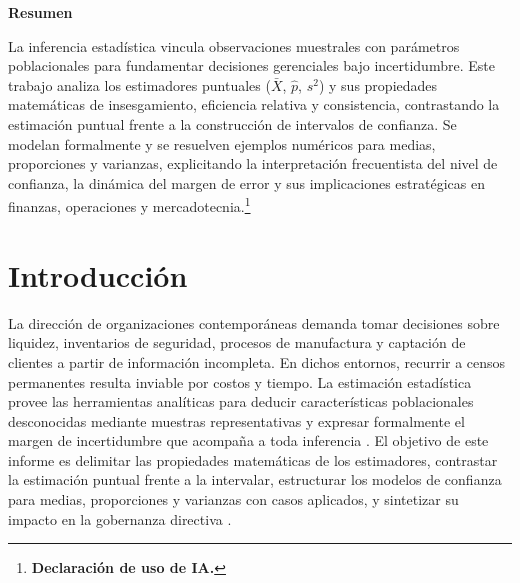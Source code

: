 \fontsize{11}{14}\selectfont\justifying
\titlespacing*{\section}{0pt}{3pt}{1pt}
\titlespacing*{\subsection}{0pt}{2pt}{1pt}
\setlength{\parskip}{1pt}
\setlength{\parindent}{0.55cm}

\begingroup
\noindent\textbf{Resumen}\par
La inferencia estadística vincula observaciones muestrales con parámetros poblacionales para fundamentar decisiones gerenciales bajo incertidumbre. Este trabajo analiza los estimadores puntuales ($\bar{X}$, $\hat{p}$, $s^2$) y sus propiedades matemáticas de insesgamiento, eficiencia relativa y consistencia, contrastando la estimación puntual frente a la construcción de intervalos de confianza. Se modelan formalmente y se resuelven ejemplos numéricos para medias, proporciones y varianzas, explicitando la interpretación frecuentista del nivel de confianza, la dinámica del margen de error y sus implicaciones estratégicas en finanzas, operaciones y mercadotecnia.\footnote{\textbf{Declaración de uso de IA.} \estadisticadeclaracionia}
\par\smallskip
\renewcommand{\contentsname}{Tabla de contenido}
\setcounter{tocdepth}{2}
\setlength{\cftbeforetoctitleskip}{0pt}\setlength{\cftaftertoctitleskip}{1pt}
\setlength{\cftbeforesecskip}{0.5pt}
\renewcommand{\cfttoctitlefont}{\normalfont\fontsize{11}{12}\selectfont\bfseries\color{itescaRedDark}}
\tableofcontents
\endgroup
\smallskip

\section{Introducción}
La dirección de organizaciones contemporáneas demanda tomar decisiones sobre liquidez, inventarios de seguridad, procesos de manufactura y captación de clientes a partir de información incompleta. En dichos entornos, recurrir a censos permanentes resulta inviable por costos y tiempo. La estimación estadística provee las herramientas analíticas para deducir características poblacionales desconocidas mediante muestras representativas y expresar formalmente el margen de incertidumbre que acompaña a toda inferencia \citep{holmesBusiness2023,wackerly2010}. El objetivo de este informe es delimitar las propiedades matemáticas de los estimadores, contrastar la estimación puntual frente a la intervalar, estructurar los modelos de confianza para medias, proporciones y varianzas con casos aplicados, y sintetizar su impacto en la gobernanza directiva \citep{anderson2012,lind2012}.

